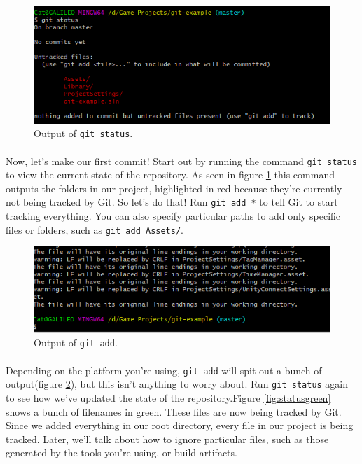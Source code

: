 \documentclass{article}
\begin{document}
\begin{figure}
    \includegraphics[width=\linewidth]{images/status.png}
    \caption{Output of \texttt{git status}.}
    \label{fig:status}
\end{figure}

\paragraph{}
Now, let's make our first commit! Start out by running the command \texttt{git status} to view the current state of the repository. As seen in figure \ref{fig:status} this command outputs the folders in our project, highlighted in red because they're currently not being tracked by Git. So let's do that! Run \texttt{git add *} to tell Git to start tracking everything. You can also specify particular paths to add only specific files or folders, such as \texttt{git add Assets/}.

\begin{figure}
    \includegraphics[width=\linewidth]{images/add-out.png}
    \caption{Output of \texttt{git add}.}
    \label{fig:addout}
\end{figure}

\paragraph{}
Depending on the platform you're using, \texttt{git add} will spit out a bunch of output(figure \ref{fig:addout}), but this isn't anything to worry about. Run \texttt{git status} again to see how we've updated the state of the repository.Figure \ref{fig:statusgreen} shows a bunch of filenames in green. These files are now being tracked by Git. Since we added everything in our root directory, every file in our project is being tracked. Later, we'll talk about how to ignore particular files, such as those generated by the tools you're using, or build artifacts.
\end{document}
